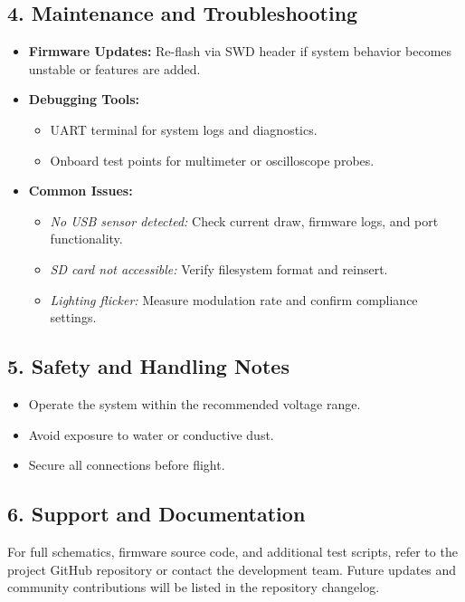 \documentclass[12pt]{article}
\begin{document}
\subsection*{4. Maintenance and Troubleshooting}

\begin{itemize}
    \item \textbf{Firmware Updates:} Re-flash via SWD header if system behavior becomes unstable or features are added.
    \item \textbf{Debugging Tools:}
    \begin{itemize}
        \item UART terminal for system logs and diagnostics.
        \item Onboard test points for multimeter or oscilloscope probes.
    \end{itemize}
    \item \textbf{Common Issues:}
    \begin{itemize}
        \item \textit{No USB sensor detected:} Check current draw, firmware logs, and port functionality.
        \item \textit{SD card not accessible:} Verify filesystem format and reinsert.
        \item \textit{Lighting flicker:} Measure modulation rate and confirm compliance settings.
    \end{itemize}
\end{itemize}

\subsection*{5. Safety and Handling Notes}

\begin{itemize}
    \item Operate the system within the recommended voltage range.
    \item Avoid exposure to water or conductive dust.
    \item Secure all connections before flight.
\end{itemize}

\subsection*{6. Support and Documentation}
For full schematics, firmware source code, and additional test scripts, refer to the project GitHub repository or contact the development team. Future updates and community contributions will be listed in the repository changelog.
\end{document}
